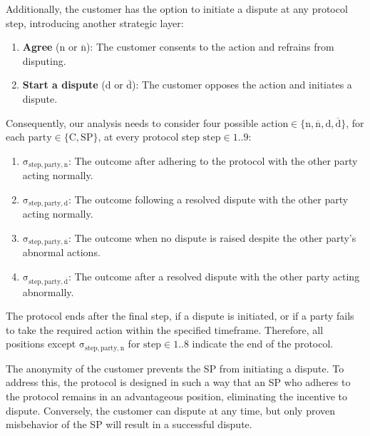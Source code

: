 \documentclass[pdftex,twocolumn,epjc3]{svjour3}
\newcommand{\normal}{\mathrm{n}}
\newcommand{\dispute}{\mathrm{d}}
\newcommand{\abnormal}{\overline{\mathrm{n}}}
\newcommand{\abdispute}{\overline{\mathrm{d}}}
\begin{document}
Additionally, the customer has the option to initiate a dispute at any protocol step, introducing another strategic layer:

\begin{enumerate}
\def\labelenumi{\arabic{enumi}.}
\item \textbf{Agree} ($\normal{}$ or $\abnormal{}$): The customer consents to the action and refrains from disputing.
\item \textbf{Start a dispute} ($\dispute{}$ or $\abdispute{}$): The customer opposes the action and initiates a dispute.
\end{enumerate}

\begin{sloppypar}
Consequently, our analysis needs to consider four possible $\mathrm{action} \in \{ \normal{}, \abnormal{}, \dispute{}, \abdispute{} \}$, for each $\mathrm{party \in \{C, SP\} }$, at every protocol step $\mathrm{step \in 1..9}$:
\end{sloppypar}

\begin{enumerate}
\item $\mathrm{\sigma_{step,party,\normal{}}}$: The outcome after adhering to the protocol with the other party acting normally.
\item $\mathrm{\sigma_{step,party,\dispute{}}}$: The outcome following a resolved dispute with the other party acting normally.
\item $\mathrm{\sigma_{step,party,\abnormal{}}}$: The outcome when no dispute is raised despite the other party's abnormal actions.
\item $\mathrm{\sigma_{step,party,\abdispute{}}}$: The outcome after a resolved dispute with the other party acting abnormally.
\end{enumerate}

\begin{sloppypar}
The protocol ends after the final step, if a dispute is initiated, or if a party fails to take the required action within the specified timeframe. Therefore, all positions except $\mathrm{\sigma_{step, party, n}}$ for $\mathrm{step} \in 1..8$ indicate the end of the protocol.
\end{sloppypar}

The anonymity of the customer prevents the SP from initiating a dispute. To address this, the protocol is designed in such a way that an SP who adheres to the protocol remains in an advantageous position, eliminating the incentive to dispute. Conversely, the customer can dispute at any time, but only proven misbehavior of the SP will result in a successful dispute.
\end{document}
